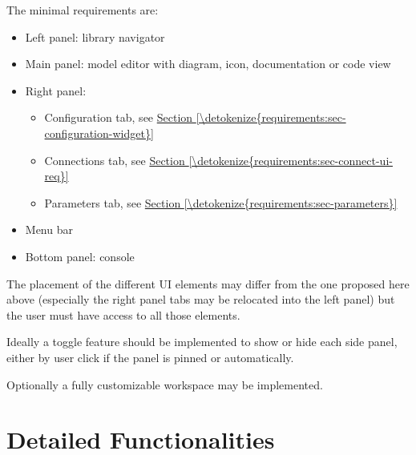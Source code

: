 \documentclass[letterpaper,10pt, openany,english]{sphinxmanual}
\begin{document}
The minimal requirements are:
\begin{itemize}
\item {} 
Left panel: library navigator

\item {} 
Main panel: model editor with diagram, icon, documentation or code view

\item {} 
Right panel:
\begin{itemize}
\item {} 
Configuration tab, see \hyperref[\detokenize{requirements:sec-configuration-widget}]{Section \ref{\detokenize{requirements:sec-configuration-widget}}}

\item {} 
Connections tab, see \hyperref[\detokenize{requirements:sec-connect-ui-req}]{Section \ref{\detokenize{requirements:sec-connect-ui-req}}}

\item {} 
Parameters tab, see \hyperref[\detokenize{requirements:sec-parameters}]{Section \ref{\detokenize{requirements:sec-parameters}}}

\end{itemize}

\item {} 
Menu bar

\item {} 
Bottom panel: console

\end{itemize}

The placement of the different UI elements may differ from the one proposed here above (especially the right panel tabs may be relocated into the left panel) but the user must have access to all those elements.

Ideally a toggle feature should be implemented to show or hide each side panel, either by user click if the panel is pinned or automatically.

Optionally a fully customizable workspace may be implemented.


\section{Detailed Functionalities}
\label{\detokenize{requirements:detailed-functionalities}}\label{\detokenize{requirements:sec-functionalities}}
\end{document}
